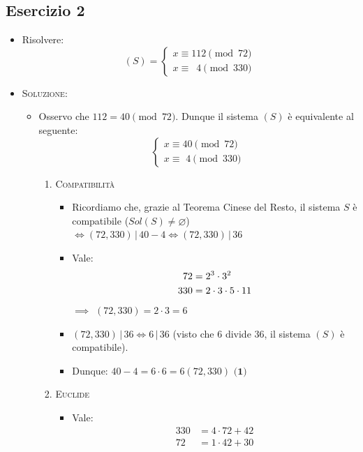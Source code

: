 \documentclass[10pt]{article}
\begin{document}
  \subsection{Esercizio 2}
	\begin{itemize}
	\item
	Risolvere:
	\[		
	(S) =
	\begin{cases}
	x \equiv 112 \!\!\!\pmod{72} \\
	x \equiv \,\,\, 4 \pmod{330}
	\end{cases}
	\]
	\item
	\textsc{Soluzione:}
	\begin{itemize}
	\item
	Osservo che $112 = 40 \pmod{72}$. Dunque il sistema $(S)$ è equivalente al seguente:
	\[		
	\begin{cases}
	x \equiv 40 \!\pmod{72} \\
	x \equiv \,\,4 \pmod{330}
	\end{cases}
	\]
	\begin{enumerate}
	\item
	\textsc{Compatibilità}
	\begin{itemize}
	\item
	Ricordiamo che, grazie al Teorema Cinese del Resto, il sistema $S$ è compatibile ($Sol(S) \neq \varnothing$) $\Longleftrightarrow (72,330)\,|\,40-4 \Longleftrightarrow (72,330)\,|\, 36$
	\item
	Vale: 
	\begin{equation}
	\begin{split}
	72 &= 2^3 \cdot 3^2 \\
	330 &= 2 \cdot 3 \cdot 5 \cdot 11 
	\notag
	\end{split}
	\end{equation} \smallskip	
	$\implies$ $(72,330) = 2 \cdot 3=6$ \smallskip
	\item
	$(72,330)\,|\,36 \Longleftrightarrow 6\,|\,36$ {\small (visto che $6$ divide $36$, il sistema $(S)$ è compatibile)}.
	\item
	Dunque: $40-4 = 6 \cdot 6 = 6(72,330)$ $\textbf{(1)}$\bigskip
	\end{itemize} 
	\item
	\textsc{Euclide}
	\begin{itemize}
	\item
	Vale:
	\begin{equation}
	\begin{split}
	330 &= 4 \cdot 72 + 42 \\
	72 &= 1 \cdot 42 + 30 \\

\end{split}
\end{equation}
\end{itemize}
\end{enumerate}
\end{itemize}
\end{itemize}
\end{document}
